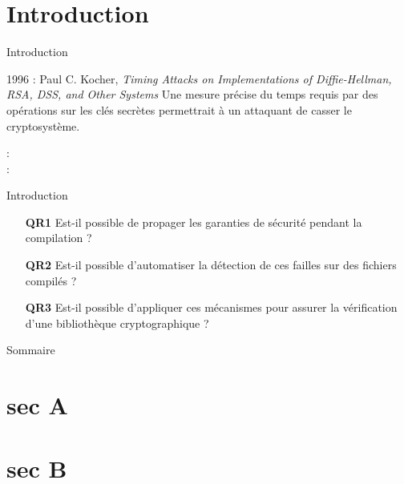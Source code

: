 \documentclass{backend/backend}
\begin{document}
\begin{frame}
    \titlepage
\end{frame}

\section*{Introduction}
\showtoctrue %

\begin{frame}{Introduction}
    
    \pause
    \begin{block}{1996 : Paul C. Kocher, \textit{Timing Attacks on Implementations of Diffie-Hellman, RSA, DSS, and Other Systems} }
        Une mesure précise du temps requis par des opérations sur les clés secrètes permettrait à un attaquant de casser le cryptosystème.
    \end{block}

     : \citeauthor{270176} \\
     : \citeauthor{stillPractical} 
\end{frame}

\begin{frame}{Introduction}
    \begin{enumerate}
        \item[\textbf{QR1}] Est-il possible de propager les garanties de sécurité pendant la compilation ?
        \item[\textbf{QR2}] Est-il possible d'automatiser la détection de ces failles sur des fichiers compilés ?
        \item[\textbf{QR3}] Est-il possible d'appliquer ces mécanismes pour assurer la vérification d'une bibliothèque cryptographique ?
    \end{enumerate}
\end{frame}

\begin{frame}{Sommaire}

        \small
        \tableofcontents

\end{frame}



\section{sec A}
\section{sec B}
\end{document}
